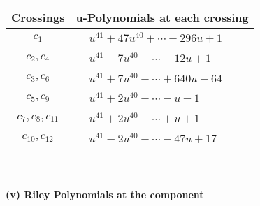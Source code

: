 \documentclass[1p]{elsarticle_modified}
\theoremstyle{definition}
\begin{document}
\begin{tabular}{m{50pt}|m{274pt}}
Crossings & \hspace{64pt}u-Polynomials at each crossing \\
\hline $$\begin{aligned}c_{1}\end{aligned}$$&$\begin{aligned}
&u^{41}+47 u^{40}+\cdots+296 u+1
\end{aligned}$\\
\hline $$\begin{aligned}c_{2},c_{4}\end{aligned}$$&$\begin{aligned}
&u^{41}-7 u^{40}+\cdots-12 u+1
\end{aligned}$\\
\hline $$\begin{aligned}c_{3},c_{6}\end{aligned}$$&$\begin{aligned}
&u^{41}+7 u^{40}+\cdots+640 u-64
\end{aligned}$\\
\hline $$\begin{aligned}c_{5},c_{9}\end{aligned}$$&$\begin{aligned}
&u^{41}+2 u^{40}+\cdots- u-1
\end{aligned}$\\
\hline $$\begin{aligned}c_{7},c_{8},c_{11}\end{aligned}$$&$\begin{aligned}
&u^{41}+2 u^{40}+\cdots+u+1
\end{aligned}$\\
\hline $$\begin{aligned}c_{10},c_{12}\end{aligned}$$&$\begin{aligned}
&u^{41}-2 u^{40}+\cdots-47 u+17
\end{aligned}$\\
\hline
\end{tabular}\\~\\
\newpage\renewcommand{\arraystretch}{1}
\flushleft \textbf{(v) Riley Polynomials at the component}\newline \\
\end{document}
